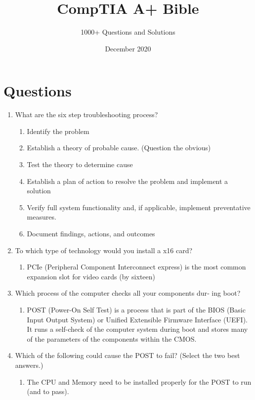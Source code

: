 \documentclass{article}
\title{CompTIA A+ Bible}
\author{1000+ Questions and Solutions}
\date{December 2020}
\begin{document}
\maketitle
\section{Questions} 
\begin{enumerate}
    \item What are the six step troubleshooting process? 
    \begin{enumerate}
        \item Identify the problem
        \item Establish a theory of probable cause. (Question the obvious) 
        \item Test the theory to determine cause
        \item Establish a plan of action to resolve the problem and implement a solution
        \item Verify full system functionality and, if applicable, implement preventative measures. 
        \item Document findings, actions, and outcomes 
    \end{enumerate}
    \item To which type of technology would you install a x16 card?
    \begin{enumerate}
        \item PCIe (Peripheral Component Interconnect express) is the most common expansion slot for video cards (by sixteen) 
    \end{enumerate}
    \item Which process of the computer checks all your components dur‐
ing boot?
    \begin{enumerate}
        \item POST (Power-On Self Test) is a process that is part of the BIOS (Basic Input Output System) or Unified Extensible Firmware Interface (UEFI). It runs a self-check of the computer system during boot and stores many of the parameters of the components within the CMOS. 
    \end{enumerate}
    \item Which of the following could cause the POST to fail? (Select
the two best answers.) 
    \begin{enumerate}
        \item The CPU and Memory need to be installed properly for the POST to run (and to pass). 
    \end{enumerate}
    

\end{enumerate}
\end{document}
